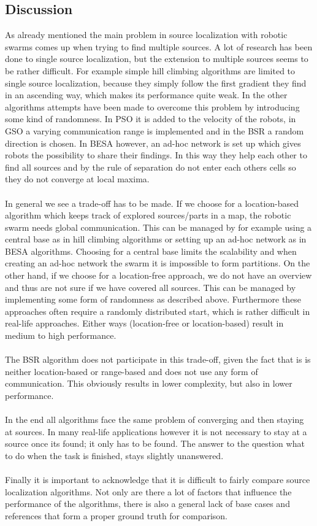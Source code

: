 	\subsection{Discussion}
  	As already mentioned the main problem in source localization with robotic swarms comes up when trying to find multiple sources. A lot of research has been done to single source localization, but the extension to multiple sources seems to be rather difficult. For example simple hill climbing algorithms are limited to single source localization, because they simply follow the first gradient they find in an ascending way, which makes its performance quite weak. In the other algorithms  attempts have been made to overcome this problem by introducing some kind of randomness. In PSO it is added to the velocity of the robots, in GSO a varying communication range is implemented and in the BSR a random direction is chosen. In BESA however, an ad-hoc network is set up which gives robots the possibility to share their findings. In this way they help each other to find all sources and by the rule of separation do not enter each others cells so they do not converge at local maxima. \\
	\\
	In general we see a trade-off has to be made. If we choose for a location-based algorithm which keeps track of explored sources/parts in a map, the robotic swarm needs global communication. This can be managed by for example using a central base as in hill climbing algorithms or setting up an ad-hoc network as in BESA algorithms. Choosing for a central base limits the scalability and when creating an ad-hoc network the swarm it is impossible to form partitions. On the other hand, if we choose for a location-free approach, we do not have an overview and thus are not sure if we have covered all sources. This can be managed by implementing some form of randomness as described above. Furthermore these approaches often require a randomly distributed start, which is rather difficult in real-life approaches. Either ways (location-free or location-based) result in medium to high performance.\\
	\\
	The BSR algorithm does not participate in this trade-off, given the fact that is is neither location-based or range-based and does not use any form of communication. This obviously results in lower complexity, but also in lower performance. \\
	\\
	In the end all algorithms face the same problem of converging and then staying at sources. In many real-life applications however it is not necessary to stay at a source once its found; it only has to be found. The answer to the question what to do when the task is finished, stays slightly unanswered.\\
	\\
	Finally it is important to acknowledge that it is difficult to fairly compare source localization algorithms. Not only are there a lot of factors that influence the performance of the algorithms, there is also a general lack of base cases and references that form a proper ground truth for comparison.

